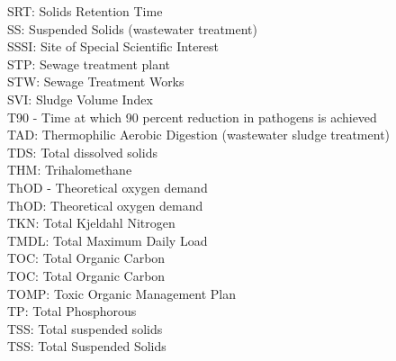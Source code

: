 \documentclass{article}
\begin{document}
SRT:  Solids Retention Time
\vspace{0.3cm}\\
SS:  Suspended Solids (wastewater treatment)
\vspace{0.3cm}\\
SSSI:  Site of Special Scientific Interest
\vspace{0.3cm}\\
STP:  Sewage treatment plant
\vspace{0.3cm}\\
STW:  Sewage Treatment Works
\vspace{0.3cm}\\
SVI:  Sludge Volume Index
\vspace{0.3cm}\\
T90 - Time at which 90 percent reduction in pathogens is achieved
\vspace{0.3cm}\\
TAD:  Thermophilic Aerobic Digestion (wastewater sludge treatment)
\vspace{0.3cm}\\
TDS:  Total dissolved solids
\vspace{0.3cm}\\
THM:  Trihalomethane
\vspace{0.3cm}\\
ThOD - Theoretical oxygen demand
\vspace{0.3cm}\\
ThOD:  Theoretical oxygen demand
\vspace{0.3cm}\\
TKN: Total Kjeldahl Nitrogen
\vspace{0.3cm}\\
TMDL:  Total Maximum Daily Load
\vspace{0.3cm}\\
TOC:  Total Organic Carbon
\vspace{0.3cm}\\
TOC: Total Organic Carbon
\vspace{0.3cm}\\
TOMP: Toxic Organic Management Plan
\vspace{0.3cm}\\
TP:  Total Phosphorous 
\vspace{0.3cm}\\
TSS:  Total suspended solids 
\vspace{0.3cm}\\
TSS: Total Suspended Solids
\vspace{0.3cm}\\
\end{document}
